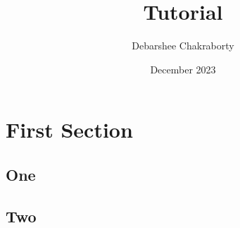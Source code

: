 \documentclass[12pt]{article}
\title{Tutorial}
\author{Debarshee Chakraborty}
\date{December 2023}
\begin{document}
\section{First Section}
\subsection{One}
    \lipsum[1-3]
\subsection{Two}
    \lipsum[4-6]
\end{document}
